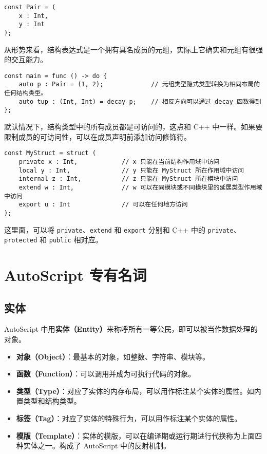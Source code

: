 \begin{lstlisting}
const Pair = (
	x : Int,
	y : Int
);
\end{lstlisting}

从形势来看，结构表达式是一个拥有具名成员的元组，实际上它确实和元组有很强的交互能力。

\begin{lstlisting}
const main = func () -> do {
	auto p : Pair = (1, 2);				// 元组类型隐式类型转换为相同布局的任何结构类型。
	auto tup : (Int, Int) = decay p;	// 相反方向可以通过 decay 函数得到
};
\end{lstlisting}

默认情况下，结构类型中的所有成员都是可访问的，这点和 C++ 中一样。如果要限制成员的可访问性，可以在成员声明前添加访问修饰符。

\begin{lstlisting}
const MyStruct = struct (
	private x : Int,			// x 只能在当前结构作用域中访问
	local y : Int,				// y 只能在 MyStruct 所在作用域中访问
	internal z : Int, 			// z 只能在 MyStruct 所在模块中访问
	extend w : Int,				// w 可以在同模块或不同模块里的延展类型作用域中访问
	export u : Int				// 可以在任何地方访问
);
\end{lstlisting}

这里面，可以将 \lstinline!private!、\lstinline!extend! 和 \lstinline!export! 分别和 C++ 中的 \lstinline!private!、\lstinline!protected! 和 \lstinline!public! 相对应。

\chapter{AutoScript 专有名词}

\section{实体}

AutoScript 中用\textbf{实体（Entity）}来称呼所有一等公民，即可以被当作数据处理的对象。

\begin{itemize}
    \item \textbf{对象（Object）}：最基本的对象，如整数、字符串、模块等。

    \item \textbf{函数（Function）}：可以调用并成为可执行代码的对象。

    \item \textbf{类型（Type）}：对应了实体的内存布局，可以用作标注某个实体的属性。如内置类型和结构类型。

    \item \textbf{标签（Tag）}：对应了实体的特殊行为，可以用作标注某个实体的属性。

    \item \textbf{模版（Template）}：实体的模版，可以在编译期或运行期进行代换称为上面四种实体之一。构成了 AutoScript 中的反射机制。
\end{itemize}

